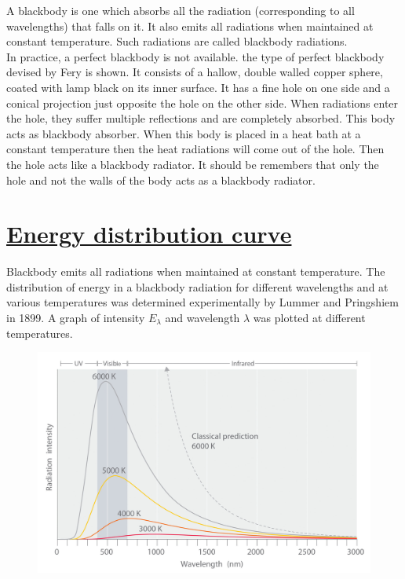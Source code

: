 \documentclass[14pt,a4paper]{article}
\begin{document}
A blackbody is one which absorbs all the radiation (corresponding to all wavelengths) that falls on it. It also emits all radiations when maintained at constant temperature. Such radiations are called blackbody radiations.
\\
In practice, a perfect blackbody is not available. the type of perfect blackbody devised by Fery is shown. It consists of a hallow, double walled copper sphere, coated with lamp black on its inner surface. It has a fine hole on one side and a conical projection just opposite the hole on the other side. When radiations enter the hole, they suffer multiple reflections and are completely absorbed. This body acts as blackbody absorber. When this body is placed in a heat bath at a constant temperature then the heat radiations will come out of the hole. Then the hole acts like a blackbody radiator. It should be remembers that only the hole and not the walls of the body acts as a blackbody radiator.

\newpage
\section{\underline{Energy distribution curve}}

Blackbody emits all radiations when maintained at constant temperature. The distribution of energy in a blackbody radiation for different wavelengths and at various temperatures was determined experimentally by Lummer and Pringshiem in 1899. A graph of intensity $E_{\lambda}$ and wavelength $\lambda$ was plotted at different temperatures. 
\begin{figure}[H]
	\centering
	\includegraphics[keepaspectratio=true,scale=0.22]{blackbody_curve.jpg}
\end{figure}
\end{document}

